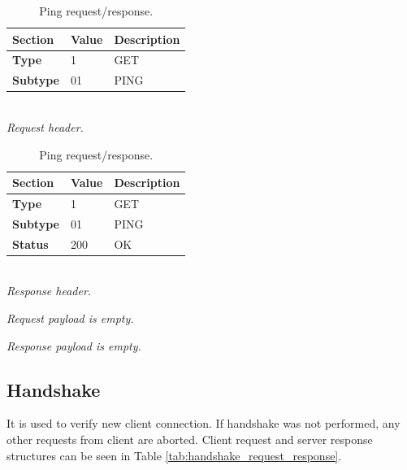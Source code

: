 \documentclass[english, sem, kiv, he, iso690alph, pdf, viewonly]{fasthesis}
\begin{document}
\begin{table}[h]
	\centering
	\begin{minipage}[b]{0.45\textwidth}
		\centering
		\begin{tabular}{|l|l|l|}
			\hline
			\textbf{Section} & \textbf{Value} & \textbf{Description} \\ \hline
			\textbf{Type} & 1 & \footnotesize{GET} \\ \hline
			\textbf{Subtype} & 01 & \footnotesize{PING} \\ \hline
		\end{tabular} \\
		\textit{Request header.}
	\end{minipage} 
	\hfill
	\begin{minipage}[b]{0.45\textwidth}
		\centering
		\begin{tabular}{|l|l|l|}
			\hline
			\textbf{Section} & \textbf{Value} & \textbf{Description} \\ \hline
			\textbf{Type} & 1 & \footnotesize{GET} \\ \hline
			\textbf{Subtype} & 01 & \footnotesize{PING} \\ \hline
			\textbf{Status} & 200 & \footnotesize{OK} \\ \hline
		\end{tabular} \\
		\textit{Response header.}
	\end{minipage} \newline

	\begin{minipage}[b]{0.45\textwidth}
		\centering
		\textit{Request payload is empty.}
	\end{minipage}	
	\hfill
	\begin{minipage}[b]{0.45\textwidth}
		\centering
		\textit{Response payload is empty.}
	\end{minipage}	
	\caption{Ping request/response.}
	\label{tab:ping_request_response}
\end{table}

\subsection{Handshake}
It is used to verify new client connection. If handshake was not performed, any other requests from client are aborted. Client request and server response structures can be seen in Table \ref{tab:handshake_request_response}.
\end{document}
